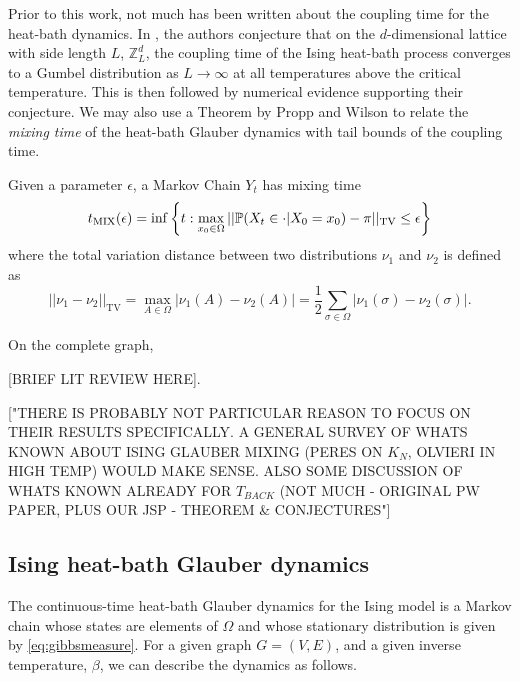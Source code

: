 	Prior to this work, not much has been written about the coupling time for the heat-bath dynamics. In \cite[Conjecture 7.1]{Collevecchio2017-nq}, the authors conjecture that on the $d$-dimensional lattice with side length $L$, $\mathbb{Z}^d_L$, the coupling time of the Ising heat-bath process converges to a Gumbel distribution as $L \rightarrow \infty$ at all temperatures above the critical temperature. This is then followed by numerical evidence supporting their conjecture. We may also use a Theorem by Propp and Wilson \cite[Theorem 5]{Propp1996-cf} to relate the \emph{mixing time} of the heat-bath Glauber dynamics with tail bounds of the coupling time.

	Given a parameter $\epsilon$, a Markov Chain $Y_t$ has mixing time
	\begin{equation}
		t_\mathrm{MIX}(\epsilon) = \inf\left\{t: \max_{x_0 \in \Omega} ||\mathbb{P}(X_t \in \cdot | X_0 = x_0) - \pi ||_\mathrm{TV} \leq \epsilon \right\}
	\end{equation}
	where the total variation distance between two distributions $\nu_1$ and $\nu_2$ is defined as 
	\begin{equation}
		||\nu_1 - \nu_2||_\mathrm{TV} = \max_{A \in \Omega}|\nu_1(A) - \nu_2(A)| = \frac{1}{2}\sum_{\sigma \in \Omega} |\nu_1(\sigma) - \nu_2(\sigma)|.
	\end{equation}
	
	On the complete graph,


	[BRIEF LIT REVIEW HERE].

	["THERE IS PROBABLY NOT PARTICULAR REASON TO FOCUS ON THEIR RESULTS SPECIFICALLY. A GENERAL SURVEY OF WHATS KNOWN ABOUT ISING GLAUBER MIXING (PERES ON $K_N$, OLVIERI IN HIGH TEMP) WOULD MAKE SENSE. ALSO SOME DISCUSSION OF WHATS KNOWN ALREADY FOR $T_{BACK}$ (NOT MUCH - ORIGINAL PW PAPER, PLUS OUR JSP - THEOREM \& CONJECTURES"]

	\subsection{Ising heat-bath Glauber dynamics}
	\label{sec:heat-bath glauber dynamics definition}
	The continuous-time heat-bath Glauber dynamics for the Ising model is a Markov chain whose states are elements of $\Omega$ and whose stationary distribution is given by \eqref{eq:gibbsmeasure}. For a given graph $G = (V, E)$, and a given inverse temperature, $\beta$, we can describe the dynamics as follows. 


